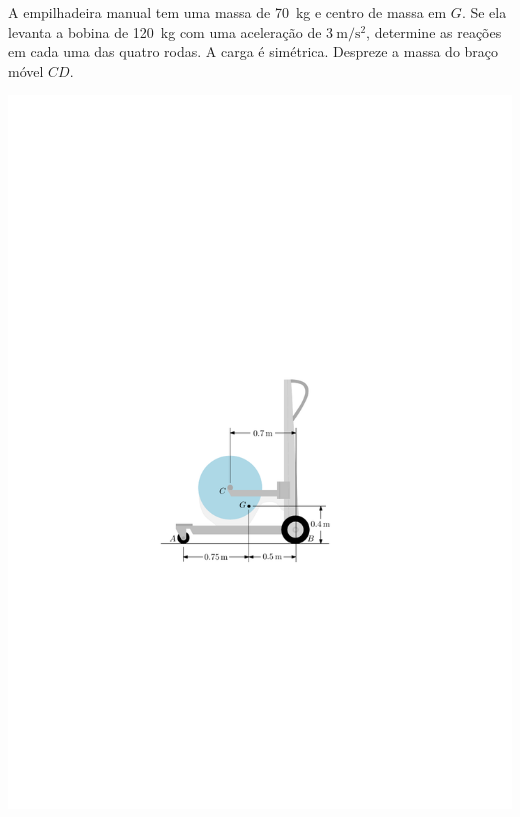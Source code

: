 \begin{multicols}{2}
	\item A empilhadeira manual tem uma massa de \SI{70}{\kilogram} e centro de massa em $G$. Se ela levanta a bobina de \SI{120}{\kilogram} com uma aceleração de $\SI{3}{\meter/\second^{2}}$, determine as reações em cada uma das quatro rodas. A carga é simétrica. Despreze a massa do braço móvel $CD$.
	
	\columnbreak
	
	\begin{flushright}
		\includegraphics[scale=1.15]{../../images/draw_4}
	\end{flushright}
\end{multicols}